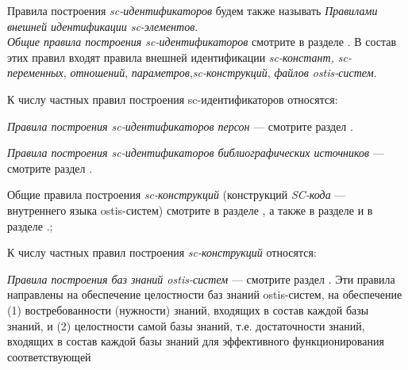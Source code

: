 \begin{SCn}
{\begin{scnvector}
\begin{scnitemize}
\begin{scnindent}
								\end{scnindent}
			            \end{scnitemize}
			\item Правила построения \textit{sc-идентификаторов} будем также
			            называть \textit{Правилами внешней идентификации sc-элементов}.\\
			            \textit{Общие правила построения sc-идентификаторов} смотрите в
			            разделе . В состав этих правил входят правила внешней
			            идентификации \textit{sc-констант, sc-переменных}, \textit{отношений},
				            \textit{параметров},\textit{sc-конструкций}, \textit{файлов ostis-систем}.
			\item К числу частных правил построения sc-идентификаторов
			            относятся:
			            \begin{scnitemize}
				            \item \textit{Правила построения sc-идентификаторов
					            персон} --- смотрите раздел .
				            \item \textit{Правила построения sc-идентификаторов
					            библиографических источников} --- смотрите раздел .
			            \end{scnitemize}
			\item Общие правила построения \textit{sc-конструкций}
			            (конструкций \textit{SC-кода} --- внутреннего языка ostis-систем) смотрите в
			            разделе , а также в разделе
			             и в разделе \scnqqi{\nameref{sd_sc_code_semantic}}.;
			\item К числу частных правил построения \textit{sc-конструкций}
			            относятся:
			            \begin{scnitemize}
				            \item \textit{Правила построения баз знаний
					            ostis-систем} --- смотрите раздел . Эти правила направлены
				            на обеспечение целостности баз знаний ostis-систем, на обеспечение (1)
				            востребованности (нужности) знаний, входящих в состав каждой базы знаний, и (2)
				            целостности самой базы знаний, т.е. достаточности знаний, входящих в состав
				            каждой базы знаний для эффективного функционирования соответствующей

\end{scnitemize}
\end{scnvector}}
\end{SCn}
